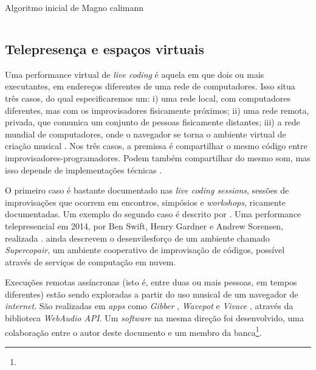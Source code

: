 \begin{example}{Algoritmo inicial de Magno calimann}
\begin{verbatim}
\end{verbatim}
\end{example}

\subsection{Telepresença e espaços virtuais}\label{sec:telepresenca}

Uma performance virtual de \emph{live coding} é aquela em que dois ou mais executantes, em endereços diferentes de uma rede de computadores. Isso situa três casos, do qual especificaremos um: i) uma rede local, com computadores diferentes, mas com os improvisadores fisicamente próximos; ii) uma rede remota, privada, que comunica um conjunto de pessoas fisicamente distantes; iii) a rede mundial de computadores, onde o navegador se torna o ambiente virtual de criação musical \cite{roberts_web_2013}. Nos três casos, a premissa é compartilhar o mesmo código entre improvisadores-programadores. Podem também compartilhar do mesmo som, mas isso depende de implementações técnicas . 

O primeiro caso é bastante documentado nas \emph{live coding sessions}, sessões de improvisações que ocorrem em encontros, simpósios e \emph{workshops}, ricamente documentadas. Um exemplo do segundo caso é descrito por . Uma performance telepresencial em 2014, por Ben Swift, Henry Gardner e Andrew Sorensen, realizada .  ainda descrevem o desenvilesforço de um ambiente chamado \emph{Supercopair}, um ambiente cooperativo de improvisação de códigos, possível através de serviços de computação em nuvem.    

Execuções remotas assíncronas (isto é, entre duas ou mais pessoas, em tempos diferentes) estão sendo exploradas a partir do uso musical de um navegador de \emph{internet}. São realizadas em \emph{apps} como \emph{Gibber} \cite{roberts_gibber:_2012}, \emph{Wavepot} e \emph{Vivace} \cite{vieira_vivace:_2015}, através da biblioteca \emph{WebAudio API}. Um \emph{software} na mesma direção foi desenvolvido, uma colaboração entre o autor deste documento e um membro da banca\footnote{}.  



